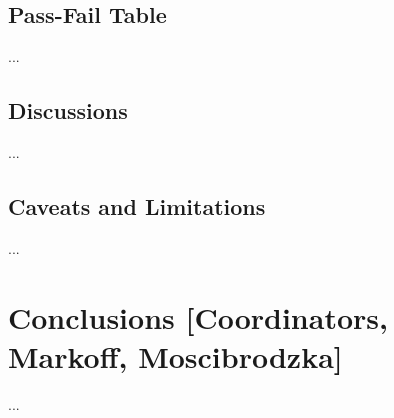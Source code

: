\documentclass[twocolumn,tighten,dvipsnames,linenumbers]{aastex63}
\begin{document}





\subsection{Pass-Fail Table}
\label{sec:passfail}

...

\subsection{Discussions}
\label{sec:discussions}

...

\subsection{Caveats and Limitations}
\label{sec:caveats}

...

\section{Conclusions
  [Coordinators, Markoff, Moscibrodzka]}
\label{sec:conclusions}

...
\end{document}
